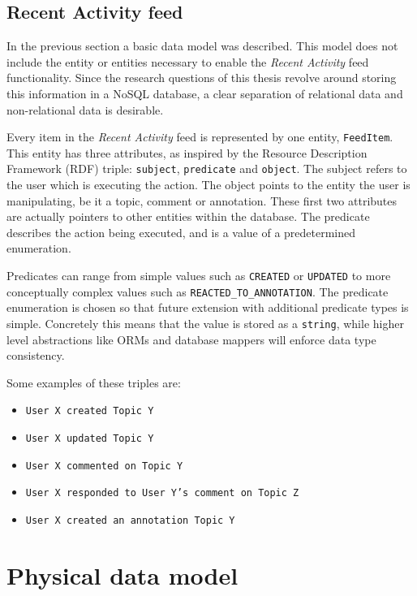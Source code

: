 \subsection{Recent Activity feed}
\label{sec:recent-activity-feed}

In the previous section a basic data model was described. This model does not include the entity or entities necessary to enable the \textit{Recent Activity} feed functionality. Since the research questions of this thesis revolve around storing this information in a NoSQL database, a clear separation of relational data and non-relational data is desirable.

Every item in the \textit{Recent Activity} feed is represented by one entity, \texttt{FeedItem}. This entity has three attributes, as inspired by the Resource Description Framework (RDF) triple: \texttt{subject}, \texttt{predicate} and \texttt{object}. The subject refers to the user which is executing the action. The object points to the entity the user is manipulating, be it a topic, comment or annotation. These first two attributes are actually pointers to other entities within the database. The predicate describes the action being executed, and is a value of a predetermined enumeration.

Predicates can range from simple values such as \texttt{CREATED} or \texttt{UPDATED} to more conceptually complex values such as \texttt{REACTED\_TO\_ANNOTATION}. The predicate enumeration is chosen so that future extension with additional predicate types is simple. Concretely this means that the value is stored as a \texttt{string}, while higher level abstractions like ORMs and database mappers will enforce data type consistency.

Some examples of these triples are:

\begin{itemize}
  \item \texttt{User X created Topic Y}
  \item \texttt{User X updated Topic Y}
  \item \texttt{User X commented on Topic Y}
  \item \texttt{User X responded to User Y's comment on Topic Z}
  \item \texttt{User X created an annotation Topic Y}
\end{itemize}

\section{Physical data model}
\label{sec:physical-data-model}

